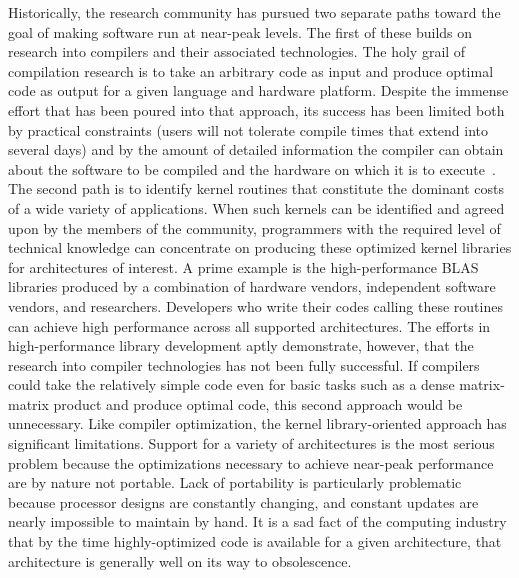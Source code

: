 \documentclass[runningheads]{llncs}
\begin{document}
Historically, the research community has pursued two separate paths toward the goal of making software run at near-peak levels.  The first of these builds on research into compilers and their associated technologies.  The holy grail of compilation research is to take an arbitrary code as input and produce optimal code as output for a given language and hardware platform.  Despite the immense effort that has been poured into that approach, its success has been limited both by practical constraints (users will not tolerate compile times that extend into several days) and by the amount of detailed information the compiler can obtain about the software to be compiled and the hardware on which it is to execute~\cite{Ken99,Wol89,Wol96}.  The second path is to identify kernel routines that constitute the dominant costs of a wide variety of applications.  When such kernels can be identified and agreed upon by the members of the community, programmers with the required level of technical knowledge can concentrate on producing these optimized kernel libraries for architectures of interest. A prime example is the high-performance BLAS libraries produced by a combination of hardware vendors, independent software vendors, and researchers.  Developers who write their codes calling these routines can achieve high performance across all supported architectures. The efforts in high-performance library development aptly demonstrate, however, that the research into compiler technologies has not been fully successful.  If compilers could take the relatively simple code even for basic tasks such as a dense matrix-matrix product and produce optimal code, this second approach would be unnecessary.    Like compiler optimization, the kernel library-oriented approach has significant limitations.  Support for a variety of architectures is the most serious problem because the optimizations necessary to achieve near-peak performance are by nature not portable.   Lack of portability is particularly problematic because processor designs are constantly changing,  and constant updates are nearly impossible to maintain by hand.  It is a sad fact of the computing industry that by the time highly-optimized code is available for a given architecture, that architecture is generally well on its way to obsolescence.   
\end{document}
